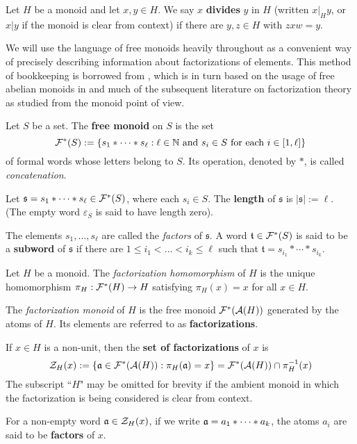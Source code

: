 \begin{defn} \label{def:divisibility}
	Let $H$ be a monoid and let $x,y\in H$.
	We say $x$ \textbf{divides} $y$ in $H$ (written $x|_H y$, or $x|y$ if the monoid is clear from context) if there are $y,z\in H$ with $zxw = y$.
\end{defn}

We will use the language of free monoids heavily throughout as a convenient way of precisely describing information about factorizations of elements.  
This method of bookkeeping is borrowed from \cite{fan-tringali18}, which is in turn based on the usage of free abelian monoids in \cite{geroldinger-hk06} and much of the subsequent literature on factorization theory as studied from the monoid point of view.

\begin{defn} \label{def:free monoid}
Let $S$ be a set.
The \textbf{free monoid} on $S$ is the set
\[\F^*(S) := \{s_1*\cdots*s_\ell: \ell\in \NN \textrm{ and } s_i\in S \textrm{ for each } i\in [1,\ell] \} \]
of formal words whose letters belong to $S$.
Its operation, denoted by $*$, is called \textit{concatenation}.

Let $\mathfrak{s}= s_1 * \cdots * s_\ell  \in \F^*(S)$, where each $s_i\in S$.
The \textbf{length} of $\mathfrak{s}$ is $| \mathfrak{s} | := \ell$.
(The empty word $\varepsilon_S$ is said to have length zero).

The elements $s_1,\dots,s_\ell$ are called the \textit{factors} of $\mathfrak{s}$. 
A word $\mathfrak{t}\in \F^*(S)$ is said to be a \textbf{subword} of $\mathfrak{s}$ if there are $1\le i_1 < \dots < i_k \le \ell$ such that $\mathfrak{t} = s_{i_1}*\cdots*s_{i_k}$.
\end{defn}


\begin{defn} \label{def:factorization}
Let $H$ be a monoid.
The \textit{factorization homomorphism} of $H$ is the unique homomorphism $\pi_H: \F^*(H) \to H$ satisfying $\pi_H(x) = x$ for all $x\in H$.

The \textit{factorization monoid} of $H$ is the free monoid $\F^*(\A(H))$ generated by the atoms of $H$.
Its elements are referred to as \textbf{factorizations}.

If $x\in H$ is a non-unit, then the \textbf{set of factorizations} of $x$ is
\[ \Z_H(x) := \{ \aa\in \F^*(\A(H)) : \pi_H(\aa) = x \} = \F^*(\A(H)) \cap \pi_H^{-1}(x) \]
The subscript ``$H$" may be omitted for brevity if the ambient monoid in which the factorization is being considered is clear from context.

For a non-empty word $\aa\in \Z_H(x)$, if we write $\aa = a_1*\cdots*a_k$, the atoms $a_i$ are said to be \textbf{factors} of $x$.
\end{defn}

